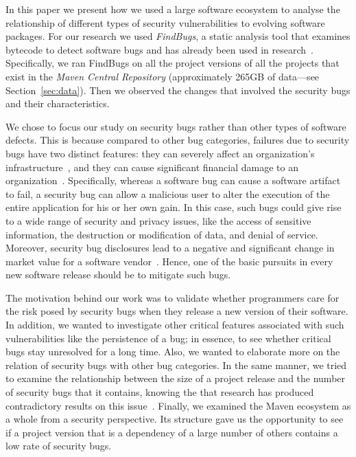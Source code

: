 \documentclass[letterpaper,twocolumn,10pt]{article}
\begin{document}
In this paper we present how we used a large software ecosystem to analyse the
relationship of different types of security vulnerabilities to 
evolving software packages.
For our research we used {\it FindBugs},
a static analysis tool that examines bytecode to detect software bugs and has already been used in
research~\cite{AP10,HP07,SHP06}.
Specifically, we ran FindBugs on all the project
versions of all the projects that exist in the
{\it Maven Central Repository}
(approximately 265GB of data---see Section~\ref{sec:data}).
Then we observed the changes that involved the security bugs and their characteristics.

We chose to focus our study on security bugs rather than other types of
software defects. This is because compared to other bug categories,
failures due to security bugs have two distinct features:
they can severely affect an organization's infrastructure~\cite{SZ12}, and
they can cause significant financial damage to
an organization~\cite{TH04,BCL08}. 
Specifically,
whereas a software bug can cause a software artifact to fail,
a security bug can allow a malicious user to alter the execution
of the entire application for his or her own gain.
In this case, such bugs could give rise to a wide
range of security and privacy issues, like
the access of sensitive information,
the destruction or modification of data, and
denial of service.	
Moreover, security bug disclosures lead to a negative and significant change
in market value for a software vendor~\cite{TW07}.
Hence, one of the basic pursuits in every new software release should
be to mitigate such bugs.

The motivation behind our work was to validate whether programmers care for
the risk posed by security bugs when they release a new version of their software.
In addition, we wanted to investigate other critical features associated with such
vulnerabilities like the persistence of a bug;
in essence, to see whether critical bugs stay unresolved for a long time.
Also, we wanted to elaborate more on the relation of security
bugs with other bug categories.
In the same manner, we tried to examine the relationship
between the size of a project release and the number of security bugs that it contains,
knowing the that research has produced contradictory results on this
issue~\cite{SYTP85,NBZ06,GKMS00}.
Finally, we examined the Maven ecosystem as a whole from a security
perspective. Its structure gave us the opportunity to see if a project version that is a dependency of
a large number of others contains a low rate of security bugs.
\end{document}
